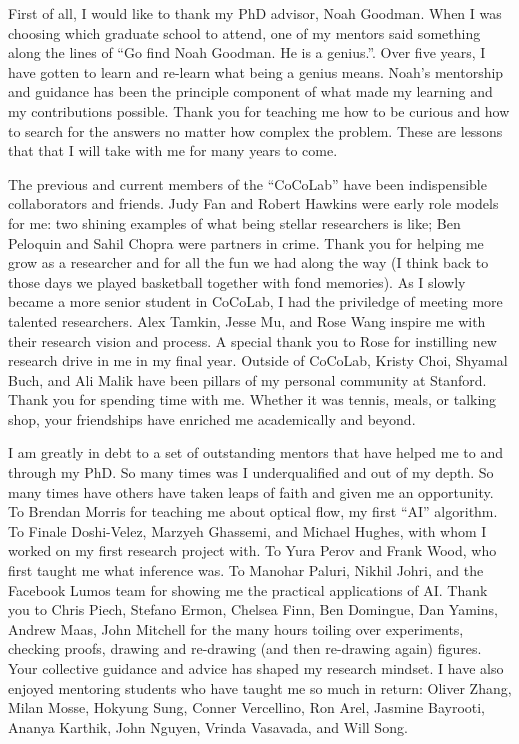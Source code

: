 First of all, I would like to thank my PhD advisor, Noah Goodman. When I was choosing which graduate school to attend, one of my mentors said something along the lines of ``Go find Noah Goodman. He is a genius.''. Over five years, I have gotten to learn and re-learn what being a genius means. Noah's mentorship and guidance has been the principle component of what made my learning and my contributions possible. Thank you for teaching me how to be curious and how to search for the answers no matter how complex the problem. These are lessons that that I will take with me for many years to come.

The previous and current members of the ``CoCoLab'' have been indispensible collaborators and friends. Judy Fan and Robert Hawkins were early role models for me: two shining examples of what being stellar researchers is like; Ben Peloquin and Sahil Chopra were partners in crime. Thank you for helping me grow as a researcher and for all the fun we had along the way (I think back to those days we played basketball together with fond memories). As I slowly became a more senior student in CoCoLab, I had the priviledge of meeting more talented researchers. Alex Tamkin, Jesse Mu, and Rose Wang inspire me with their research vision and process. A special thank you to Rose for instilling new research drive in me in my final year. Outside of CoCoLab, Kristy Choi, Shyamal Buch, and Ali Malik have been pillars of my personal community at Stanford. Thank you for spending time with me. Whether it was tennis, meals, or talking shop, your friendships have enriched me academically and beyond.

I am greatly in debt to a set of outstanding mentors that have helped me to and through my PhD. So many times was I underqualified and out of my depth. So many times have others have taken leaps of faith and given me an opportunity. To Brendan Morris for teaching me about optical flow, my first ``AI'' algorithm. To Finale Doshi-Velez, Marzyeh Ghassemi, and Michael Hughes, with whom I worked on my first research project with. To Yura Perov and Frank Wood, who first taught me what inference was. To Manohar Paluri, Nikhil Johri, and the Facebook Lumos team for showing me the practical applications of AI. Thank you to Chris Piech, Stefano Ermon, Chelsea Finn, Ben Domingue, Dan Yamins, Andrew Maas, John Mitchell for the many hours toiling over experiments, checking proofs, drawing and re-drawing (and then re-drawing again) figures. Your collective guidance and advice has shaped my research mindset. I have also enjoyed mentoring students who have taught me so much in return: Oliver Zhang, Milan Mosse, Hokyung Sung, Conner Vercellino, Ron Arel, Jasmine Bayrooti, Ananya Karthik, John Nguyen, Vrinda Vasavada, and Will Song.

